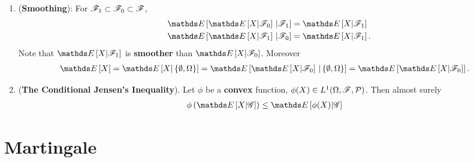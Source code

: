 \documentclass[11pt]{article}
\begin{document}
\begin{itemize}
\begin{proposition}
\begin{enumerate}
\item (\textbf{Smoothing}): For ${\mathscr F}_{1}\subset {\mathscr F}_{0} \subset {\mathscr F}$, 
\begin{align*}
\E{}{\E{}{X| \srF_{0}}\,|\srF_{1} } &= \E{}{X| \srF_{1}}\\
\E{}{\E{}{X| \srF_{1}}\,|\srF_{0} } &= \E{}{X| \srF_{1}}.
\end{align*} Note that $ \E{}{X| \srF_{1}}$ is \textbf{smoother} than $ \E{}{X| \srF_{0}}$.
Moreover
\begin{align*}
\E{}{X} = \E{}{X| \set{\emptyset, \Omega}} &= \E{}{\E{}{X| \srF_{0}}\,|\set{\emptyset, \Omega} } = \E{}{\E{}{X| \srF_{0}}}.
\end{align*}


\item (\textbf{The Conditional Jensen's Inequality}). Let $\phi$ be a \textbf{convex} function, $\phi(X) \in L^1(\Omega, {\mathscr F}, {\mathcal P})$. Then almost surely
\begin{align*}
\phi\paren{\E{}{X | \srG}} &\le \E{}{\phi(X) | \srG}
\end{align*}
\end{enumerate}
\end{proposition}
\end{itemize}

\section{Martingale}
\end{document}
